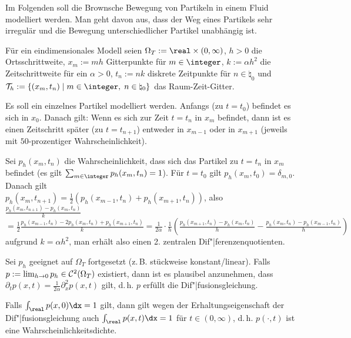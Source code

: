 \begin{Bsp}
    Im Folgenden soll die Brownsche Bewegung von Partikeln in einem Fluid modelliert werden.
    Man geht davon aus, dass der Weg eines Partikels sehr irregulär und die Bewegung
    unterschiedlicher Partikel unabhängig ist.

    Für ein eindimensionales Modell seien $\Omega_T := \real \times (0, \infty)$,
    $h > 0$ die Ortsschrittweite,
    $x_m := mh$ Gitterpunkte für $m \in \integer$,
    $k := \alpha h^2$ die Zeitschrittweite für ein $\alpha > 0$,
    $t_n := nk$ diskrete Zeitpunkte für $n \in \natural_0$ und
    $\T_h := \{(x_m, t_n) \;|\; m \in \integer,\; n \in \natural_0\}$ das Raum-Zeit-Gitter.

    Es soll ein einzelnes Partikel modelliert werden.
    Anfangs (zu $t = t_0$) befindet es sich in $x_0$.
    Danach gilt:
    Wenn es sich zur Zeit $t = t_n$ in $x_m$ befindet, dann ist es einen Zeitschritt später
    (zu $t = t_{n+1}$) entweder in $x_{m-1}$ oder in $x_{m+1}$
    (jeweils mit $50$-prozentiger Wahrscheinlichkeit).

    Sei $p_h(x_m, t_n)$ die Wahrscheinlichkeit, dass sich das Partikel zu $t = t_n$ in $x_m$
    befindet (es gilt $\sum_{m \in \integer} p_h(x_m, t_n) = 1$).
    Für $t = t_0$ gilt $p_h(x_m, t_0) = \delta_{m,0}$.
    Danach gilt\\
    $p_h(x_m, t_{n+1}) = \frac{1}{2} (p_h(x_{m-1}, t_n) + p_h(x_{m+1}, t_n))$, also
    $\frac{p_h(x_m, t_{n+1}) - p_h(x_m, t_n)}{k}$\\
    $= \frac{1}{2} \frac{p_h(x_{m-1}, t_n) - 2p_h(x_m, t_n) + p_h(x_{m+1}, t_n)}{k}
    = \frac{1}{2\alpha} \cdot \frac{1}{h}
    \left(\frac{p_h(x_{m+1}, t_n) - p_h(x_m, t_n)}{h} -
    \frac{p_h(x_m, t_n) - p_h(x_{m-1}, t_n)}{h}\right)$
    aufgrund $k = \alpha h^2$,
    man erhält also einen 2. zentralen Dif"|ferenzenquotienten.

    Sei $p_h$ geeignet auf $\Omega_T$ fortgesetzt
    (z.\,B. stückweise konstant/linear).
    Falls\\
    $p := \lim_{h \to 0} p_h \in \mathcal{C}^2(\Omega_T)$ existiert, dann ist es plausibel
    anzunehmen, dass\\
    $\partial_t p(x, t) = \frac{1}{2\alpha} \partial_x^2 p(x, t)$ gilt,
    d.\,h. $p$ erfüllt die Dif"|fusionsgleichung.

    Falls $\int_\real p(x, 0)\dx = 1$ gilt, dann gilt wegen der Erhaltungseigenschaft der
    Dif"|fusionsgleichung auch $\int_\real p(x, t)\dx = 1$ für $t \in (0, \infty)$, d.\,h.
    $p(\cdot, t)$ ist eine Wahrscheinlichkeitsdichte.
\end{Bsp}

\pagebreak
